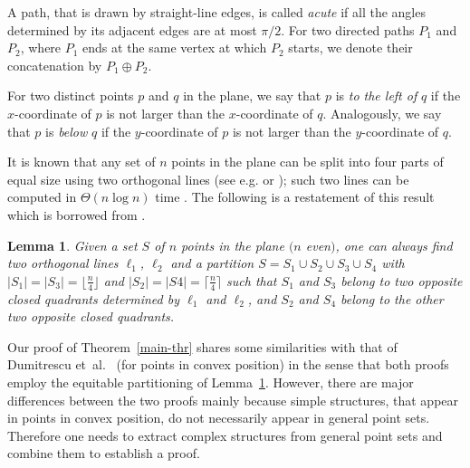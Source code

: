 \documentclass[11pt,letter]{article}
\newcommand{\etal}{{et~al.}}
\newtheorem{lemma}{Lemma}
\begin{document}
A path, that is drawn by straight-line edges, is called {\em acute} if all the angles determined by its adjacent edges are at most $\pi/2$.
For two directed paths $P_1$ and $P_2$, where $P_1$ ends at the same vertex at which $P_2$ starts, we denote their concatenation by $P_1\oplus P_2$. 

For two distinct points $p$ and $q$ in the plane, we say that $p$ is {\em to the left of} $q$ if the $x$-coordinate of $p$ is not larger than the $x$-coordinate of $q$.
Analogously, we say that $p$ is {\em below} $q$ if the $y$-coordinate of $p$ is not larger than the $y$-coordinate of $q$.

It is known that any set of $n$ points in the plane can be split into four parts of equal size using two orthogonal lines (see e.g. \cite{Roy2007} or \cite[Section 6.6]{Courant1979}); such two lines can be computed in $\Theta(n\log n)$ time \cite{Roy2007}. The following is a restatement of this result which is borrowed from \cite{Dumitrescu12}.

\begin{lemma}
	\label{equitable-partition-lemma}
	Given a set $S$ of $n$ points in the plane $(n$ even$)$, one can always find two orthogonal lines $\ell_1$, $\ell_2$ and a partition $S = S_1 \cup S_2 \cup S_3 \cup S_4$ with $|S_1| = |S_3| = \lfloor \frac{n}{4}\rfloor$ and $|S_2| = |S4| = \lceil \frac{n}{4}\rceil$ such that $S_1$ and $S_3$ belong to two opposite closed quadrants determined by $\ell_1$ and $\ell_2$, and $S_2$ and $S_4$ belong to the other two opposite closed quadrants.
\end{lemma}

Our proof of Theorem~\ref{main-thr} shares some similarities with that of Dumitrescu \etal~\cite{Dumitrescu12} (for points in convex position) in the sense that both proofs employ the equitable partitioning of Lemma~\ref{equitable-partition-lemma}. However, there are major differences between the two proofs mainly because simple structures, that appear in points in convex position, do not necessarily appear in general point sets. Therefore one needs to extract complex structures from general point sets and combine them to establish a proof.

\end{document}
